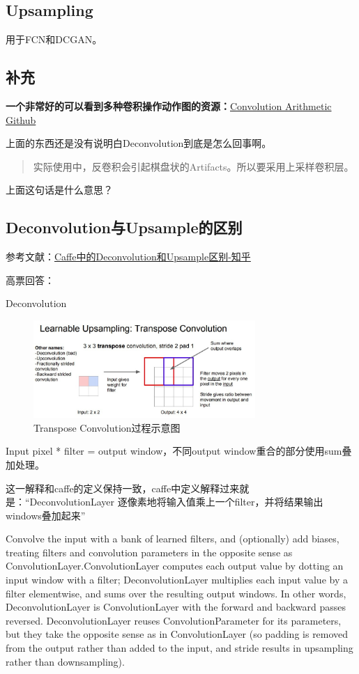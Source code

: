 \subsection{Upsampling}
用于FCN\cite{Fcn2014}和DCGAN。

\subsection{补充}

{\bfseries 一个非常好的可以看到多种卷积操作动作图的资源：}\href{https://github.com/vdumoulin/conv_arithmetic}{Convolution Arithmetic Github}


上面的东西还是没有说明白Deconvolution到底是怎么回事啊。

\begin{quote}
实际使用中，反卷积会引起棋盘状的Artifacts。所以要采用上采样卷积层。
\end{quote}
上面这句话是什么意思？

\subsection{Deconvolution与Upsample的区别}

参考文献：\href{https://www.zhihu.com/question/63890195}{Caffe中的Deconvolution和Upsample区别-知乎}

高票回答：

Deconvolution

\begin{figure}[!htbp]
\centering
\includegraphics[width=0.75\textwidth]{DLTips/Deconvolution0.jpg}
\caption{Transpose Convolution过程示意图}
\label{Deconvolution0}
\end{figure}

Input pixel * filter = output window，不同output window重合的部分使用sum叠加处理。

这一解释和caffe的定义保持一致，caffe中定义解释过来就是：“DeconvolutionLayer 逐像素地将输入值乘上一个filter，并将结果输出windows叠加起来”

Convolve the input with a bank of learned filters, and (optionally) add biases, treating filters and convolution parameters in the opposite sense as ConvolutionLayer.ConvolutionLayer computes each output value by dotting an input window with a filter; DeconvolutionLayer multiplies each input value by a filter elementwise, and sums over the resulting output windows. In other words, DeconvolutionLayer is ConvolutionLayer with the forward and backward passes reversed. DeconvolutionLayer reuses ConvolutionParameter for its parameters, but they take the opposite sense as in ConvolutionLayer (so padding is removed from the output rather than added to the input, and stride results in upsampling rather than downsampling).

